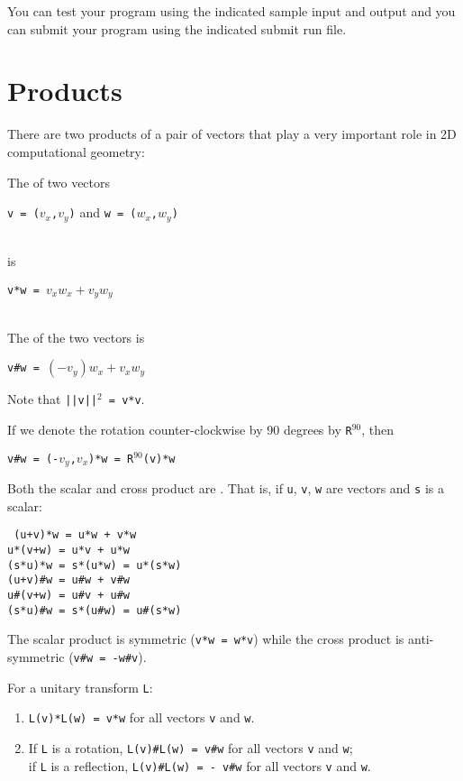 \documentclass[12pt]{article}
\begin{document}
You can test your program using the indicated sample input and
output and you can submit your program using the indicated submit
run file.

\newpage

\section{Products}
There are two products of a pair of vectors that play a
very important role in 2D computational geometry:

\begin{definition}
The  of two vectors \\
\centerline{{\tt v = ($v_x$,$v_y$)} and {\tt w = ($w_x$,$w_y$)}} \\
is \\
\centerline{\tt v*w = $v_x w_x + v_y w_y$} \\
The  of the two vectors is \\
\centerline{\tt v\#w = $(-v_y)w_x + v_x w_y$}
\end{definition}

Note that {\tt ||v||$^2$ = v*v}.

If we denote the rotation counter-clockwise by 90 degrees by {\tt R}$^{90}$,
then \\
\centerline{\tt v\#w = (-$v_y$,$v_x$)*w = R$^{90}$(v)*w}

Both the scalar and cross product are .  That is,
if {\tt u}, {\tt v}, {\tt w} are vectors and {\tt s} is a scalar:
\begin{center}
\tt
(u+v)*w = u*w + v*w \\
u*(v+w) = u*v + u*w \\
(s*u)*w = s*(u*w) = u*(s*w) \\
(u+v)\#w = u\#w + v\#w \\
u\#(v+w) = u\#v + u\#w \\
(s*u)\#w = s*(u\#w) = u\#(s*w)
\end{center}

The scalar product is symmetric ({\tt v*w = w*v})
while the cross product is anti-symmetric ({\tt v\#w = -w\#v}).

\begin{lemma}
For a unitary transform {\tt L}:
\begin{enumerate}
\item {\tt L(v)*L(w) = v*w} for all vectors {\tt v} and {\tt w}.
\item If {\tt L} is a rotation,
         {\tt L(v)\#L(w) = v\#w} for all vectors {\tt v} and {\tt w}; \\
      if {\tt L} is a reflection,
         {\tt L(v)\#L(w) = - v\#w} for all vectors {\tt v} and {\tt w}.
\end{enumerate}
\end{lemma}
\end{document}
